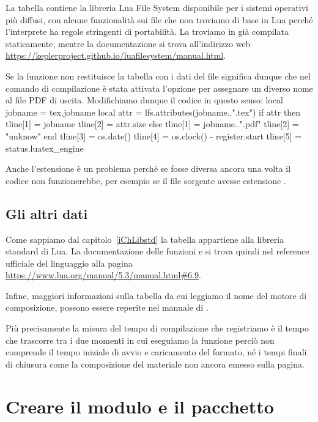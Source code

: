 La tabella  contiene la libreria Lua File System disponibile per i
sistemi operativi più diffusi, con alcune funzionalità sui file che non troviamo
di base in Lua perché l'interprete ha regole stringenti di portabilità. La
troviamo in \LuaTeX{} già compilata staticamente, mentre la documentazione
si trova all'indirizzo web
\url{https://keplerproject.github.io/luafilesystem/manual.html}.

Se la funzione  non restituisce la tabella con i dati del
file significa dunque che nel comando di compilazione è stata attivata l'opzione
 per assegnare un diverso nome al file PDF di uscita.
Modifichiamo dunque il codice in questo senso:
\lines
local jobname = tex.jobname
local attr = lfs.attributes(jobname..".tex")
if attr then
    tline[1] = jobname
    tline[2] = attr.size
else
    tline[1] = jobname..".pdf"
    tline[2] = "unknow"    
end
tline[3] = os.date()
tline[4] = os.clock() - register.start
tline[5] = status.luatex_engine
\endlines
{}

Anche l'estensione  è un problema perché se fosse diversa ancora una
volta il codice non funzionerebbe, per esempio se il file sorgente avesse
estensione .


\subsection{Gli altri dati}

Come sappiamo dal capitolo~\ref{iChLibstd} la tabella  appartiene alla
libreria standard di Lua. La documentazione delle funzioni  e
 si trova quindi nel reference ufficiale del linguaggio alla pagina
\url{https://www.lua.org/manual/5.3/manual.html#6.9}.

Infine, maggiori informazioni sulla tabella  da cui leggiamo il nome
del motore di composizione, possono essere reperite nel manuale di \LuaTeX{}.

Più precisamente la misura del tempo di compilazione che registriamo è il tempo
che trascorre tra i due momenti in cui eseguiamo la funzione 
perciò non comprende il tempo iniziale di avvio e caricamento del formato, né i
tempi finali di chiusura come la composizione del materiale non ancora emesso
sulla pagina.


\section{Creare il modulo e il pacchetto}

